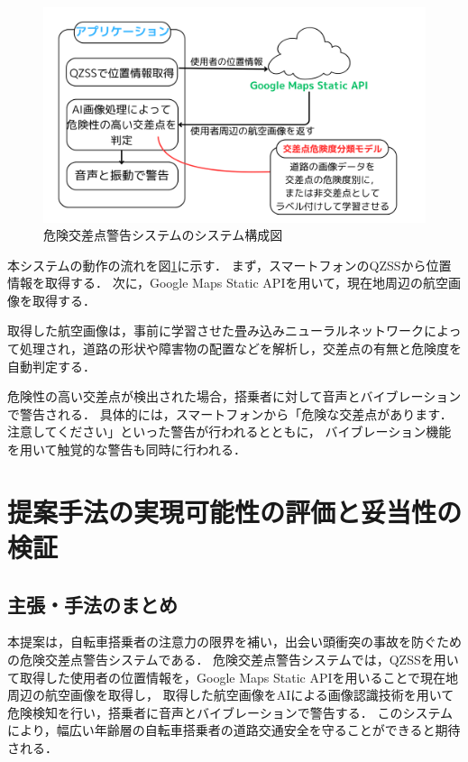 \documentclass[uplatex,dvipdfmx]{jsarticle}
\begin{document}
\begin{figure}[H]
  \centering
  \includegraphics[width=14cm]{./Figs/system_new.png}
  \caption{危険交差点警告システムのシステム構成図}
  \label{fig:system}
\end{figure}

本システムの動作の流れを図\ref{fig:system}に示す．
まず，スマートフォンのQZSSから位置情報を取得する．
次に，Google Maps Static APIを用いて，現在地周辺の航空画像を取得する．

取得した航空画像は，事前に学習させた畳み込みニューラルネットワークによって処理され，道路の形状や障害物の配置などを解析し，交差点の有無と危険度を自動判定する．

危険性の高い交差点が検出された場合，搭乗者に対して音声とバイブレーションで警告される．
具体的には，スマートフォンから「危険な交差点があります．注意してください」といった警告が行われるとともに，
バイブレーション機能を用いて触覚的な警告も同時に行われる．

\section{提案手法の実現可能性の評価と妥当性の検証}

\subsection{主張・手法のまとめ}
本提案は，自転車搭乗者の注意力の限界を補い，出会い頭衝突の事故を防ぐための危険交差点警告システムである．
危険交差点警告システムでは，QZSSを用いて取得した使用者の位置情報を，Google Maps Static APIを用いることで現在地周辺の航空画像を取得し，
取得した航空画像をAIによる画像認識技術を用いて危険検知を行い，搭乗者に音声とバイブレーションで警告する．
このシステムにより，幅広い年齢層の自転車搭乗者の道路交通安全を守ることができると期待される．
\end{document}
